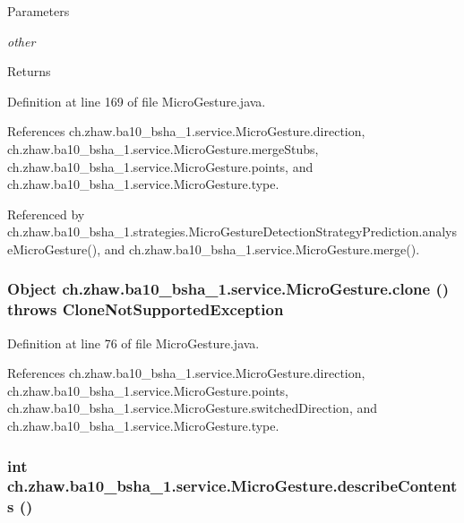 \begin{DoxyParams}{Parameters}
\item[{\em other}]\end{DoxyParams}
\begin{DoxyReturn}{Returns}

\end{DoxyReturn}


Definition at line 169 of file MicroGesture.java.

References ch.zhaw.ba10\_\-bsha\_\-1.service.MicroGesture.direction, ch.zhaw.ba10\_\-bsha\_\-1.service.MicroGesture.mergeStubs, ch.zhaw.ba10\_\-bsha\_\-1.service.MicroGesture.points, and ch.zhaw.ba10\_\-bsha\_\-1.service.MicroGesture.type.

Referenced by ch.zhaw.ba10\_\-bsha\_\-1.strategies.MicroGestureDetectionStrategyPrediction.analyseMicroGesture(), and ch.zhaw.ba10\_\-bsha\_\-1.service.MicroGesture.merge().\hypertarget{classch_1_1zhaw_1_1ba10__bsha__1_1_1service_1_1MicroGesture_a8fcc5afd682a4e6f39d6a813903e483f}{
\subsubsection[{clone}]{\setlength{\rightskip}{0pt plus 5cm}Object ch.zhaw.ba10\_\-bsha\_\-1.service.MicroGesture.clone ()  throws CloneNotSupportedException }}
\label{classch_1_1zhaw_1_1ba10__bsha__1_1_1service_1_1MicroGesture_a8fcc5afd682a4e6f39d6a813903e483f}


Definition at line 76 of file MicroGesture.java.

References ch.zhaw.ba10\_\-bsha\_\-1.service.MicroGesture.direction, ch.zhaw.ba10\_\-bsha\_\-1.service.MicroGesture.points, ch.zhaw.ba10\_\-bsha\_\-1.service.MicroGesture.switchedDirection, and ch.zhaw.ba10\_\-bsha\_\-1.service.MicroGesture.type.\hypertarget{classch_1_1zhaw_1_1ba10__bsha__1_1_1service_1_1MicroGesture_a907d378703ba728992346b911b127339}{
\subsubsection[{describeContents}]{\setlength{\rightskip}{0pt plus 5cm}int ch.zhaw.ba10\_\-bsha\_\-1.service.MicroGesture.describeContents ()}}
\label{classch_1_1zhaw_1_1ba10__bsha__1_1_1service_1_1MicroGesture_a907d378703ba728992346b911b127339}



